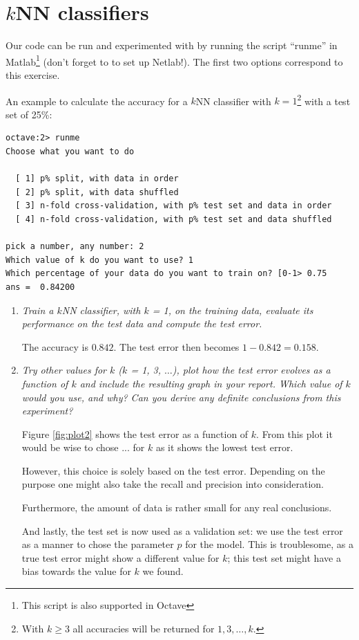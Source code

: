 \documentclass[a4paper,11pt]{article}
\begin{document}


\section{$k$NN classifiers}
\label{sec:two}
Our code can be run and experimented with by running the script ``runme'' 
in Matlab\footnote{This script is also supported in Octave} (don't forget to
to set up Netlab!). 
The first two options correspond to this exercise. 

An example to calculate the accuracy for a $k$NN classifier with $k = 1$\footnote{With $k \ge 3$ all accuracies will be returned for $1, 3, \ldots, k$.}
with a test set of 25\%: 
\begin{verbatim}
octave:2> runme
Choose what you want to do

  [ 1] p% split, with data in order
  [ 2] p% split, with data shuffled
  [ 3] n-fold cross-validation, with p% test set and data in order
  [ 4] n-fold cross-validation, with p% test set and data shuffled

pick a number, any number: 2
Which value of k do you want to use? 1
Which percentage of your data do you want to train on? [0-1> 0.75
ans =  0.84200
\end{verbatim}

\begin{enumerate}
\item \textit{Train a $k$NN classifier, with $k$ = 1, on the training data, evaluate its performance on the test data and
compute the test error.}

The accuracy is $0.842$. The test error then becomes $1 - 0.842 = 0.158$. 

\item \textit{Try other values for $k$ ($k$ = 1, 3, $\ldots$), plot how the test error evolves as a function of $k$ and include the
resulting graph in your report. Which value of $k$ would you use, and why? Can you derive any definite
conclusions from this experiment?
}

Figure \ref{fig:plot2} shows the test error as a function of $k$. From this
plot it would be wise to chose ... for $k$ as it shows the lowest test error. 

However, this choice is solely based on the test error. Depending on the 
purpose one might also take the recall and precision into consideration. 

Furthermore, the amount of data is rather small for any real conclusions.

And lastly, the test set is now used as a validation set: we use the test 
error as a manner to chose the parameter $p$ for the model. 
This is troublesome, as a true test error might show a different value for 
$k$; this test set might have a bias towards the value for $k$ we found.


\end{enumerate}
\end{document}
